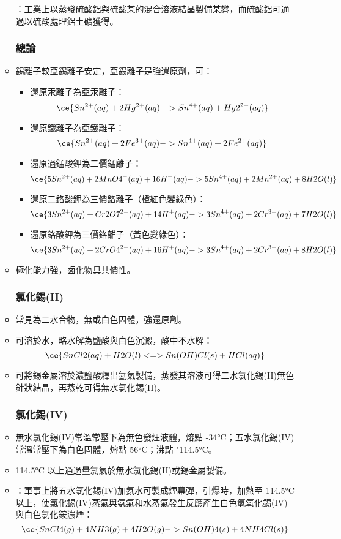 \documentclass[a4paper,12pt]{report}
\begin{document}
\begin{itemize}
\begin{itemize}
：工業上以蒸發硫酸鋁與硫酸某的混合溶液結晶製備某礬，而硫酸鋁可通過以硫酸處理鋁土礦獲得。
\subsubsection{總論}
\bit
\item 錫離子較亞錫離子安定，亞錫離子是強還原劑，可：
\begin{itemize}
\item 還原汞離子為亞汞離子：
\[\ce{Sn^{2+}(aq) + 2Hg^{2+}(aq) -> Sn^{4+}(aq) + Hg2^{2+}(aq)}\]
\item 還原鐵離子為亞鐵離子：
\[\ce{Sn^{2+}(aq) + 2Fe^{3+}(aq) -> Sn^{4+}(aq) + 2Fe^{2+}(aq)}\]
\item 還原過錳酸鉀為二價錳離子：
\[\ce{5Sn^{2+}(aq) + 2MnO4^-(aq) + 16H^+(aq) -> 5Sn^{4+}(aq) + 2Mn^{2+}(aq) + 8H2O(l)}\]
\item 還原二鉻酸鉀為三價鉻離子（橙紅色變綠色）：
\[\ce{3Sn^{2+}(aq) + Cr2O7^{2-}(aq) + 14H^+(aq) -> 3Sn^{4+}(aq) + 2Cr^{3+}(aq) + 7H2O(l)}\]
\item 還原鉻酸鉀為三價鉻離子（黃色變綠色）：
\[\ce{3Sn^{2+}(aq) + 2CrO4^{2-}(aq) + 16H^+(aq) -> 3Sn^{4+}(aq) + 2Cr^{3+}(aq) + 8H2O(l)}\]
\end{itemize}
\item {}極化能力強，鹵化物具共價性。
\eit
\subsubsection{氯化錫(II)}
\bit
\item 常見為二水合物，無或白色固體，強還原劑。
\item 可溶於水，略水解為鹽酸與白色沉澱，酸中不水解：
\[\ce{SnCl2(aq) + H2O(l) <=> Sn(OH)Cl(s) + HCl(aq)}\]
\item 可將錫金屬溶於濃鹽酸釋出氫氣製備，蒸發其溶液可得二水氯化錫(II)無色針狀結晶，再蒸乾可得無水氯化錫(II)。
\eit
\subsubsection{氯化錫(IV)}
\bit
\item 無水氯化錫(IV)常溫常壓下為無色發煙液體，熔點 -34°C；五水氯化錫(IV)常溫常壓下為白色固體，熔點 56°C；沸點 "114.5°C。
\item 114.5°C 以上通過量氯氣於無水氯化錫(II)或錫金屬製備。
\item {}：軍事上將五水氯化錫(IV)加氨水可製成煙幕彈，引爆時，加熱至 114.5°C 以上，使氯化錫(IV)蒸氣與氨氣和水蒸氣發生反應產生白色氫氧化錫(IV)與白色氯化銨濃煙：
\[\ce{SnCl4(g) + 4NH3(g) + 4H2O(g) -> Sn(OH)4(s) + 4NH4Cl(s)}\]
\eit
{}

\end{itemize}
\end{itemize}
\end{document}
